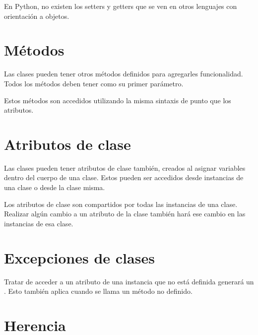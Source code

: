 En Python, no existen los setters y getters que se ven en otros lenguajes con orientación a objetos.

\section{Métodos}

Las clases pueden tener otros métodos definidos para agregarles funcionalidad. Todos los métodos deben tener  como su primer parámetro.\smallskip

Estos métodos son accedidos utilizando la misma sintaxis de punto que los atributos.


\section{Atributos de clase}

Las clases pueden tener atributos de clase también, creados al asignar variables dentro del cuerpo de una clase. Estos pueden ser accedidos desde instancias de una clase o desde la clase misma.


Los atributos de clase son compartidos por todas las instancias de una clase. Realizar algún cambio a un atributo de la clase también hará ese cambio en las instancias de esa clase.


\section{Excepciones de clases}

Tratar de acceder a un atributo de una instancia que no está definida generará un . Esto también aplica cuando se llama un método no definido.



\section{Herencia}

